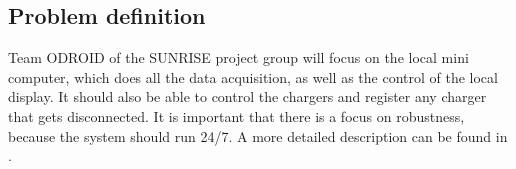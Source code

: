\subsection{Problem definition}
Team ODROID of the SUNRISE project group will focus on the local mini computer, which does all the data acquisition, as well as the control of the local display. It should also be able to control the chargers and register any charger that gets disconnected. It is important that there is a focus on robustness, because the system should run 24/7. A more detailed description can be found in .